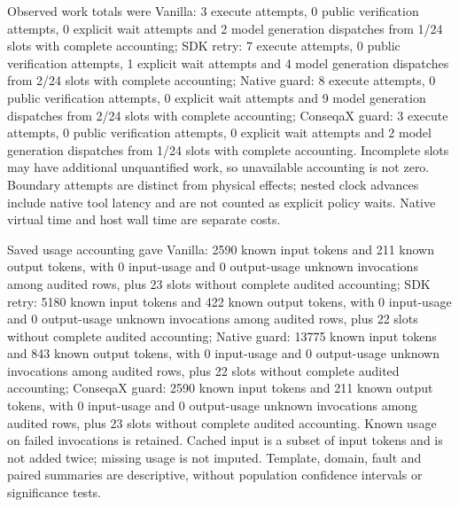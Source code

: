 Observed work totals were Vanilla: 3 execute attempts, 0 public verification attempts, 0 explicit wait attempts and 2 model generation dispatches from 1/24 slots with complete accounting; SDK retry: 7 execute attempts, 0 public verification attempts, 1 explicit wait attempts and 4 model generation dispatches from 2/24 slots with complete accounting; Native guard: 8 execute attempts, 0 public verification attempts, 0 explicit wait attempts and 9 model generation dispatches from 2/24 slots with complete accounting; ConseqaX guard: 3 execute attempts, 0 public verification attempts, 0 explicit wait attempts and 2 model generation dispatches from 1/24 slots with complete accounting. Incomplete slots may have additional unquantified work, so unavailable accounting is not zero. Boundary attempts are distinct from physical effects; nested clock advances include native tool latency and are not counted as explicit policy waits. Native virtual time and host wall time are separate costs.

Saved usage accounting gave Vanilla: 2590 known input tokens and 211 known output tokens, with 0 input-usage and 0 output-usage unknown invocations among audited rows, plus 23 slots without complete audited accounting; SDK retry: 5180 known input tokens and 422 known output tokens, with 0 input-usage and 0 output-usage unknown invocations among audited rows, plus 22 slots without complete audited accounting; Native guard: 13775 known input tokens and 843 known output tokens, with 0 input-usage and 0 output-usage unknown invocations among audited rows, plus 22 slots without complete audited accounting; ConseqaX guard: 2590 known input tokens and 211 known output tokens, with 0 input-usage and 0 output-usage unknown invocations among audited rows, plus 23 slots without complete audited accounting. Known usage on failed invocations is retained. Cached input is a subset of input tokens and is not added twice; missing usage is not imputed. Template, domain, fault and paired summaries are descriptive, without population confidence intervals or significance tests.
